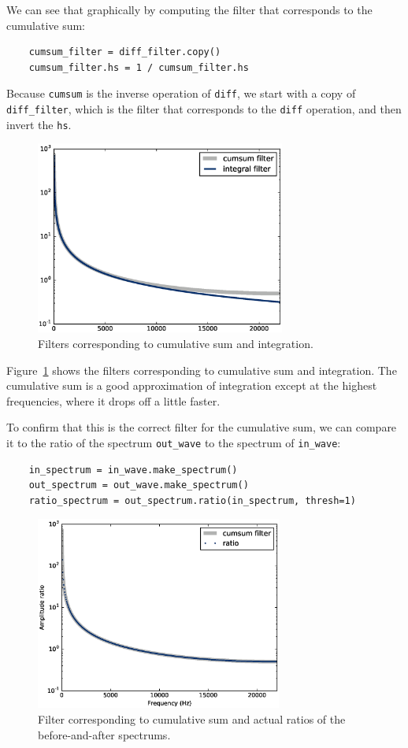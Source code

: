 \documentclass[12pt]{book}
\begin{document}
We can see that graphically by computing the filter that corresponds
to the cumulative sum:

\begin{verbatim}
    cumsum_filter = diff_filter.copy()
    cumsum_filter.hs = 1 / cumsum_filter.hs
\end{verbatim}

Because {\tt cumsum} is the inverse operation of {\tt diff}, we
start with a copy of \verb"diff_filter", which is the filter
that corresponds to the {\tt diff} operation, and then invert the
{\tt hs}.

\begin{figure}
\centerline{\includegraphics[height=2.5in]{figs/diff_int8.eps}}
\caption{Filters corresponding to cumulative sum and integration.}
\label{fig.diff_int8}
\end{figure}

Figure~\ref{fig.diff_int8} shows the filters corresponding to
cumulative sum and integration.  The cumulative sum is a good
approximation of integration except at the highest frequencies,
where it drops off a little faster. 

To confirm that this is the correct filter for the cumulative
sum, we can compare it to the ratio of the spectrum
\verb"out_wave" to the spectrum of \verb"in_wave":

\begin{verbatim}
    in_spectrum = in_wave.make_spectrum()
    out_spectrum = out_wave.make_spectrum()
    ratio_spectrum = out_spectrum.ratio(in_spectrum, thresh=1)
\end{verbatim}

\begin{figure}
\centerline{\includegraphics[height=2.5in]{figs/diff_int9.eps}}
\caption{Filter corresponding to cumulative sum and actual ratios of
  the before-and-after spectrums.}
\label{fig.diff_int9}
\end{figure}
\end{document}
